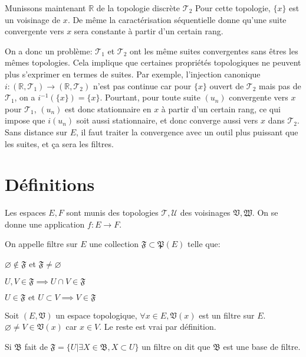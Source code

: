 \documentclass[a4paper, 11pt, french]{book}
\newenvironment{itemise}{\itemize}{\enditemize}
\theoremstyle{plain} %
\theoremstyle{definition} %
\theoremstyle{remark} %
\newcommand{\1}{\mathds{1}}
\newcommand\vide{\varnothing}
\newcommand{\inv}[1]{#1^{-1}}
\newcommand\et{\text{ et }}
\newcommand{\R}{\mathbb{R}}
\begin{document}
Munissons maintenant $\R$ de la topologie discrète $\mathscr{T}_2$
Pour cette topologie, $\{x\}$ est un voisinage de $x$.
De même la caractérisation séquentielle donne qu'une suite convergente vers $x$ sera constante à partir d'un certain rang.

On a donc un problème: $\mathscr{T}_1$ et $\mathscr{T}_2$ ont les même suites convergentes sans êtres les mêmes topologies.
Cela implique que certaines propriétés topologiques ne peuvent plus s’exprimer en termes de suites.
Par exemple, l’injection canonique $i : (\R, \mathscr{T}_1)\rightarrow (\R, \mathscr{T}_2)$ n’est pas continue car pour $\{x\}$ ouvert de $\mathscr{T}_2$ mais pas de $\mathscr{T}_1$, on a $\inv{i}(\{x\})=\{x\}$.
Pourtant, pour toute suite $(u_n)$ convergente vers $x$ pour $\mathscr{T}_1$, $(u_n)$ est donc stationnaire en $x$ à partir d'un certain rang, ce qui impose que $i(u_n)$ soit aussi stationnaire, et donc converge aussi vers $x$ dans $\mathscr{T}_2$.
Sans distance sur $E$, il faut traiter la convergence avec un outil plus puissant que les suites, et ça sera les filtres.

\section{Définitions}

Les espaces $E, F$ sont munis des topologies $\mathscr{T}, \mathscr{U}$ des voisinages $\mathfrak{V}, \mathfrak{W}$.
On se donne une application $f:E\rightarrow F$.

On appelle filtre sur $E$ une collection $\mathfrak{F}\subset\mathfrak{P}(E)$ telle que:
\begin{itemise}
	\item $\vide\notin\mathfrak{F}$ et $\mathfrak{F}\neq\vide$
	\item $U, V\in\mathfrak{F}\implies U\cap V\in\mathfrak{F}$
	\item $U\in\mathfrak{F}\et U\subset V\implies V\in\mathfrak{F}$
\end{itemise}

\exemple
Soit $(E, \mathfrak{V})$ un espace topologique, $\forall x\in E, \mathfrak{V}(x)$ est un filtre sur $E$.
\demonstration
$\vide\neq V\in\mathfrak{V}(x)$ car $x\in V$.
Le reste est vrai par définition.

Si $\mathfrak{B}$ fait de $\mathfrak{F}=\{U|\exists X\in\mathfrak{B}, X\subset U\}$ un filtre on dit que $\mathfrak{B}$ est une base de filtre.
\end{document}
